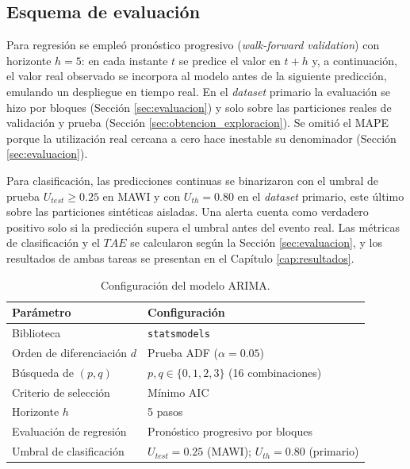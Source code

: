\documentclass[12pt]{report}
\begin{document}
\subsection*{Esquema de evaluación}

Para regresión se empleó pronóstico progresivo (\textit{walk-forward validation}) con horizonte $h=5$: en cada instante $t$ se predice el valor en $t+h$ y, a continuación, el valor real observado se incorpora al modelo antes de la siguiente predicción, emulando un despliegue en tiempo real. En el \textit{dataset} primario la evaluación se hizo por bloques (Sección \ref{sec:evaluacion}) y solo sobre las particiones reales de validación y prueba (Sección \ref{sec:obtencion_exploracion}). Se omitió el MAPE porque la utilización real cercana a cero hace inestable su denominador (Sección \ref{sec:evaluacion}).

Para clasificación, las predicciones continuas se binarizaron con el umbral de prueba $U_{test} \geq 0.25$ en MAWI y con $U_{th}=0.80$ en el \textit{dataset} primario, este último sobre las particiones sintéticas aisladas. Una alerta cuenta como verdadero positivo solo si la predicción supera el umbral antes del evento real. Las métricas de clasificación y el $TAE$ se calcularon según la Sección \ref{sec:evaluacion}, y los resultados de ambas tareas se presentan en el Capítulo \ref{cap:resultados}.

\begin{table}[H]
    \centering
    \begin{tabular}{|l|p{5.5cm}|}
        \hline
        \textbf{Parámetro} & \textbf{Configuración} \\
        \hline
        Biblioteca & \texttt{statsmodels} \\
        Orden de diferenciación $d$ & Prueba ADF ($\alpha=0.05$) \\
        Búsqueda de $(p,q)$ & $p,q \in \{0,1,2,3\}$ (16 combinaciones) \\
        Criterio de selección & Mínimo AIC \\
        Horizonte $h$ & 5 pasos \\
        Evaluación de regresión & Pronóstico progresivo por bloques \\
        Umbral de clasificación & $U_{test}=0.25$ (MAWI); $U_{th}=0.80$ (primario) \\
        \hline
    \end{tabular}
    \caption{Configuración del modelo ARIMA.}
    \label{tab:config_arima}
\end{table}
\end{document}
